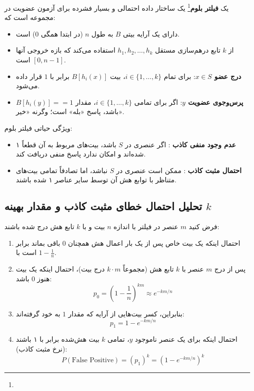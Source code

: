 \begin{definition}
یک \textbf{فیلتر بلوم}\footnote{} یک ساختار داده احتمالی و بسیار فشرده برای آزمون عضویت در مجموعه است که:
\begin{itemize}
    \item دارای یک آرایه بیتی $B$ به طول $n$ (در ابتدا همگی $0$) است.
    \item از $k$ تابع درهم‌سازی مستقل $h_1, h_2, \dots, h_k$ استفاده می‌کند که بازه خروجی آنها $[0, n-1]$ است.
    \item \textbf{درج عضو $x \in S$}: برای تمام $i \in \{1, \dots, k\}$، بیت $B[h_i(x)]$ برابر با $1$ قرار داده می‌شود.
    \item \textbf{پرس‌وجوی عضویت $y$}: اگر برای تمامی $i \in \{1, \dots, k\}$، مقدار $B[h_i(y)] == 1$ باشد، پاسخ «بله» است؛ وگرنه «خیر».
\end{itemize}
\end{definition}

ویژگی حیاتی فیلتر بلوم:
\begin{itemize}
    \item \textbf{عدم وجود منفی کاذب }: اگر عنصری در $S$ باشد، بیت‌های مربوط به آن قطعاً ۱ شده‌اند و امکان ندارد پاسخ منفی دریافت کند.
    \item \textbf{احتمال مثبت کاذب }: ممکن است عنصری در $S$ نباشد، اما تصادفاً تمامی بیت‌های متناظر با توابع هش آن توسط سایر عناصر ۱ شده باشند.
\end{itemize}

\subsection{تحلیل احتمال خطای مثبت کاذب و مقدار بهینه \texorpdfstring{$k$}{k}}
فرض کنید $m$ عنصر در فیلتر با اندازه $n$ بیت و با $k$ تابع هش درج شده باشند:
\begin{enumerate}
    \item احتمال اینکه یک بیت خاص پس از یک بار اعمال هش همچنان $0$ باقی بماند برابر است با $1 - \frac{1}{n}$.
    \item پس از درج $m$ عنصر با $k$ تابع هش (مجموعاً $k \cdot m$ درج بیت)، احتمال اینکه یک بیت هنوز $0$ باشد:
    \begin{equation}
    p_0 = \left( 1 - \frac{1}{n} \right)^{km} \approx e^{-km/n}
    \end{equation}
    \item بنابراین، کسر بیت‌هایی از آرایه که مقدار $1$ به خود گرفته‌اند:
    \begin{equation}
    p_1 = 1 - e^{-km/n}
    \end{equation}
    \item احتمال اینکه برای یک عنصر ناموجود $y$، تمامی $k$ بیت هش‌شده برابر با ۱ باشند (نرخ مثبت کاذب):
    \begin{equation}
    P(\text{False Positive}) = (p_1)^k = \left( 1 - e^{-km/n} \right)^k
    \end{equation}
\end{enumerate}

